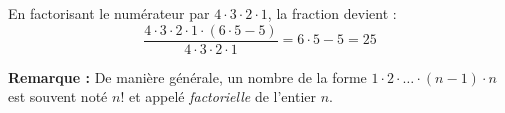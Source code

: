 En factorisant le numérateur par $4\cdot 3\cdot 2\cdot 1$, la fraction devient :
$$\frac{4\cdot 3\cdot 2\cdot 1 \cdot (6\cdot 5 -5)}{4\cdot 3\cdot 2\cdot 1} = 6\cdot 5 - 5 = 25$$

\textbf{Remarque :} De manière générale, un nombre de la forme $1\cdot 2 \cdot \ldots \cdot (n-1) \cdot n$ est souvent noté $n!$ et appelé \emph{factorielle} de l'entier $n$.